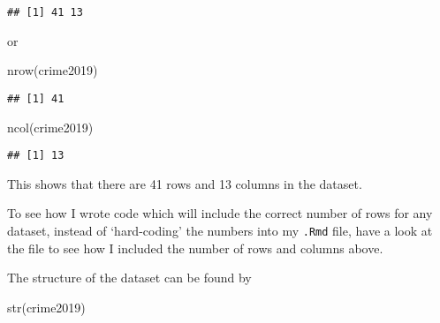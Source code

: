 \documentclass[
]{article}
\newenvironment{Shaded}{\begin{snugshade}}{\end{snugshade}}
\newcommand{\FunctionTok}[1]{\textcolor[rgb]{0.00,0.00,0.00}{#1}}
\newcommand{\NormalTok}[1]{#1}
\begin{document}
\begin{verbatim}
## [1] 41 13
\end{verbatim}

or

\begin{Shaded}
\begin{Highlighting}[]
\FunctionTok{nrow}\NormalTok{(crime2019)}
\end{Highlighting}
\end{Shaded}

\begin{verbatim}
## [1] 41
\end{verbatim}

\begin{Shaded}
\begin{Highlighting}[]
\FunctionTok{ncol}\NormalTok{(crime2019)}
\end{Highlighting}
\end{Shaded}

\begin{verbatim}
## [1] 13
\end{verbatim}

This shows that there are 41 rows and 13 columns in the dataset.

To see how I wrote code which will include the correct number of rows
for any dataset, instead of `hard-coding' the numbers into my
\texttt{.Rmd} file, have a look at the file to see how I included the
number of rows and columns above.

The structure of the dataset can be found by

\begin{Shaded}
\begin{Highlighting}[]
\FunctionTok{str}\NormalTok{(crime2019)}
\end{Highlighting}
\end{Shaded}
\end{document}
